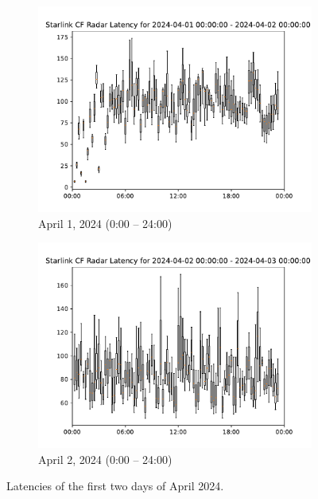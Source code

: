 \begin{figure}
	\centering
	\begin{subfigure}[b]{\textwidth}
		\includegraphics[width=\textwidth]{chapters/4-results/latency/img/cf_radar_latency_2024-04-01.pdf}
		\caption{April 1, 2024 (0:00 -- 24:00)}
	\end{subfigure}
	\begin{subfigure}[b]{\textwidth}
		\includegraphics[width=\textwidth]{chapters/4-results/latency/img/cf_radar_latency_2024-04-02.pdf}
		\caption{April 2, 2024 (0:00 -- 24:00)}
	\end{subfigure}
	\caption{Latencies of the first two days of April 2024.}
	\label{fig:latency-per-weekday-1st-2nd-april}
\end{figure}

